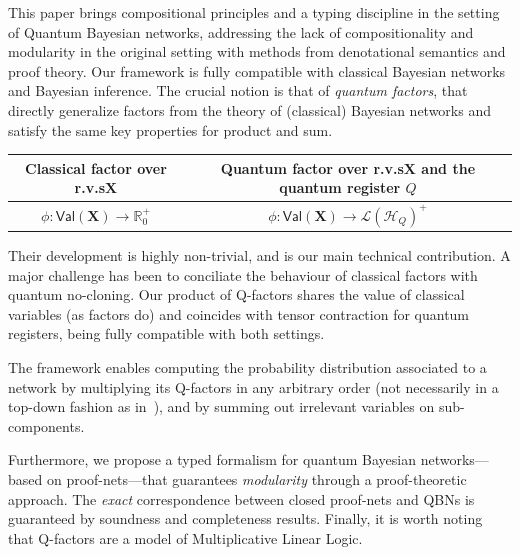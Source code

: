 \documentclass[10pt,a4paper]{article}
\newcommand{\Real}{\mathbb{R}}
\newcommand{\nnReal}{\Real^+_0}
\newcommand*{\setofrv}[1]{\mathsf{Val}(#1)}
\newcommand{\bX}{\mathbf X}
\renewcommand{\L}{\mathcal{L}}
\newcommand{\Pos}[1]{{\L(#1)}^+}
\newcommand{\HH}{\mathcal{H}}
\newcommand{\reg}{Q}
\newcommand{\qreg}{\reg}
\newcommand*{\someqfact}{\phi}
\newcommand{\rvs}{r.v.s\xspace}
\newcommand*{\qfactor}{Q-factor}
\newcommand*{\QBN}{quantum Bayesian network}
\newcommand*{\QBNs}{Quantum Bayesian networks\xspace}
\begin{document}
This paper brings compositional principles and a typing discipline in the setting of \QBNs, addressing the lack of compositionality and modularity in the original setting with methods from denotational semantics and proof theory.
Our framework is fully compatible with classical Bayesian networks and Bayesian inference.
The crucial notion is that of \emph{quantum factors}, that directly generalize factors from the theory of (classical) Bayesian networks and satisfy the same key properties for product and sum.
\begin{center}
\begin{tabular}{|c|c|}
\hline
Classical factor over \rvs $\bX$ & Quantum factor over \rvs $\bX$ and the quantum register $\qreg$
\\
\hline
$\phi:\setofrv{\bX} \to \nnReal$	& $\someqfact: \setofrv{\bX} \to \Pos{\HH_\qreg}$
\\
\hline
\end{tabular}
\end{center}
Their development is highly non-trivial, and is our main technical contribution.
A major challenge has been to conciliate the behaviour of classical factors with quantum no-cloning.
Our product of \qfactor s shares the value of classical variables (as factors do) and coincides with tensor contraction for quantum registers, being fully compatible with both settings.

The framework enables computing the probability distribution associated to a network by multiplying its \qfactor s in any arbitrary order (not necessarily in a top-down fashion as in~\cite{GBN2014}), and by summing out irrelevant variables on sub-components.

Furthermore, we propose a typed formalism for \QBN s---based on proof-nets---that guarantees \emph{modularity} through a proof-theoretic approach.
The \emph{exact} correspondence between closed proof-nets and QBNs is guaranteed by soundness and completeness results.
Finally, it is worth noting that \qfactor s are a model of Multiplicative Linear Logic.
\end{document}
